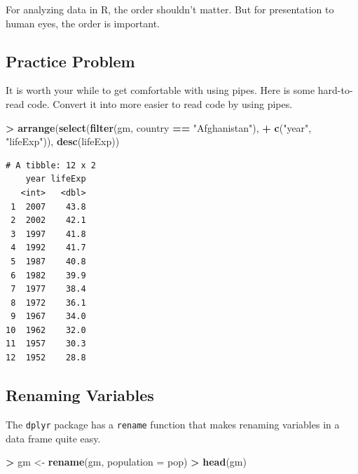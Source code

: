 \documentclass[
]{krantz}
\makeatletter
\newenvironment{Shaded}{\begin{snugshade}}{\end{snugshade}}
\newcommand{\DataTypeTok}[1]{\textcolor[rgb]{0.27,0.27,0.27}{#1}}
\newcommand{\KeywordTok}[1]{\textcolor[rgb]{0.27,0.27,0.27}{\textbf{#1}}}
\newcommand{\NormalTok}[1]{#1}
\newcommand{\OperatorTok}[1]{\textcolor[rgb]{0.43,0.43,0.43}{\textbf{#1}}}
\newcommand{\StringTok}[1]{\textcolor[rgb]{0.5,0.5,0.5}{#1}}
\newenvironment{kframe}{%
\medskip{}
\setlength{\fboxsep}{.8em}
 \def\at@end@of@kframe{}%
 \ifinner\ifhmode%
  \def\at@end@of@kframe{\end{minipage}}%
  \begin{minipage}{\columnwidth}%
 \fi\fi%
 \def\FrameCommand##1{\hskip\@totalleftmargin \hskip-\fboxsep
 \colorbox{shadecolor}{##1}\hskip-\fboxsep
     \hskip-\linewidth \hskip-\@totalleftmargin \hskip\columnwidth}%
 \MakeFramed {\advance\hsize-\width
   \@totalleftmargin\z@ \linewidth\hsize
   \@setminipage}}%
 {\par\unskip\endMakeFramed%
 \at@end@of@kframe}
\renewenvironment{Shaded}{\begin{kframe}}{\end{kframe}}
\makeatother
\begin{document}
For analyzing data in R, the order shouldn't matter. But for presentation to human eyes, the order is important.

\hypertarget{practice-problem-9}{%
\subsection{Practice Problem}\label{practice-problem-9}}

It is worth your while to get comfortable with using pipes. Here is some hard-to-read code. Convert it into more easier to read code by using pipes.

\begin{Shaded}
\begin{Highlighting}[]
\OperatorTok{\textgreater{}}\StringTok{ }\KeywordTok{arrange}\NormalTok{(}\KeywordTok{select}\NormalTok{(}\KeywordTok{filter}\NormalTok{(gm, country }\OperatorTok{==}\StringTok{ "Afghanistan"}\NormalTok{), }
\OperatorTok{+}\StringTok{                }\KeywordTok{c}\NormalTok{(}\StringTok{"year"}\NormalTok{, }\StringTok{"lifeExp"}\NormalTok{)), }\KeywordTok{desc}\NormalTok{(lifeExp))}
\end{Highlighting}
\end{Shaded}

\begin{verbatim}
# A tibble: 12 x 2
    year lifeExp
   <int>   <dbl>
 1  2007    43.8
 2  2002    42.1
 3  1997    41.8
 4  1992    41.7
 5  1987    40.8
 6  1982    39.9
 7  1977    38.4
 8  1972    36.1
 9  1967    34.0
10  1962    32.0
11  1957    30.3
12  1952    28.8
\end{verbatim}

\hypertarget{renaming-variables}{%
\subsection{Renaming Variables}\label{renaming-variables}}

The \texttt{dplyr} package has a \texttt{rename} function that makes renaming variables in a data frame quite easy.

\begin{Shaded}
\begin{Highlighting}[]
\OperatorTok{\textgreater{}}\StringTok{ }\NormalTok{gm \textless{}{-}}\StringTok{ }\KeywordTok{rename}\NormalTok{(gm, }\DataTypeTok{population =}\NormalTok{ pop)}
\OperatorTok{\textgreater{}}\StringTok{ }\KeywordTok{head}\NormalTok{(gm)}
\end{Highlighting}
\end{Shaded}
\end{document}
